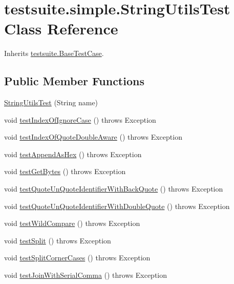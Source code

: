 \hypertarget{classtestsuite_1_1simple_1_1_string_utils_test}{}\section{testsuite.\+simple.\+String\+Utils\+Test Class Reference}
\label{classtestsuite_1_1simple_1_1_string_utils_test}


Inherits \mbox{\hyperlink{classtestsuite_1_1_base_test_case}{testsuite.\+Base\+Test\+Case}}.

\subsection*{Public Member Functions}
\begin{DoxyCompactItemize}
\item 
\mbox{\hyperlink{classtestsuite_1_1simple_1_1_string_utils_test_a566d21caf24b123669b3bb7bdbba4e88}{String\+Utils\+Test}} (String name)
\item 
void \mbox{\hyperlink{classtestsuite_1_1simple_1_1_string_utils_test_a8de93983177d6655b04484cf8391f653}{test\+Index\+Of\+Ignore\+Case}} ()  throws Exception 
\item 
void \mbox{\hyperlink{classtestsuite_1_1simple_1_1_string_utils_test_ab362d991d7ebb0bed6bc4b88f9b4ddf4}{test\+Index\+Of\+Quote\+Double\+Aware}} ()  throws Exception 
\item 
void \mbox{\hyperlink{classtestsuite_1_1simple_1_1_string_utils_test_a9e77da990d423971834bb35bb79cf936}{test\+Append\+As\+Hex}} ()  throws Exception 
\item 
void \mbox{\hyperlink{classtestsuite_1_1simple_1_1_string_utils_test_abbf535f829fabba1d7d3c205c37e092e}{test\+Get\+Bytes}} ()  throws Exception 
\item 
void \mbox{\hyperlink{classtestsuite_1_1simple_1_1_string_utils_test_a674e096dd56440c0872b382f87edd909}{test\+Quote\+Un\+Quote\+Identifier\+With\+Back\+Quote}} ()  throws Exception 
\item 
void \mbox{\hyperlink{classtestsuite_1_1simple_1_1_string_utils_test_adb8f4c412143b740afd9fe6c70018660}{test\+Quote\+Un\+Quote\+Identifier\+With\+Double\+Quote}} ()  throws Exception 
\item 
void \mbox{\hyperlink{classtestsuite_1_1simple_1_1_string_utils_test_a2c88f5e437abcdfdb41c193ff8eb2841}{test\+Wild\+Compare}} ()  throws Exception 
\item 
void \mbox{\hyperlink{classtestsuite_1_1simple_1_1_string_utils_test_a535b80b532dc2f62828f79c5fec8605f}{test\+Split}} ()  throws Exception 
\item 
void \mbox{\hyperlink{classtestsuite_1_1simple_1_1_string_utils_test_a99205fb8cc261bc7c1bb4968a0cca52a}{test\+Split\+Corner\+Cases}} ()  throws Exception 
\item 
void \mbox{\hyperlink{classtestsuite_1_1simple_1_1_string_utils_test_ad3089385684c930cb80aa1331e215bd1}{test\+Join\+With\+Serial\+Comma}} ()  throws Exception 
\end{DoxyCompactItemize}
